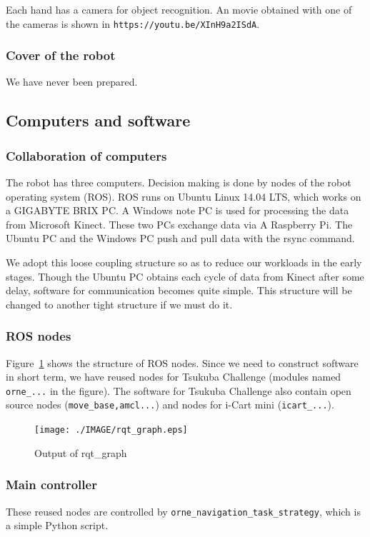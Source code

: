 \documentclass{llncs}
\begin{document}
Each hand has a camera for object recognition.
An movie obtained with one of the cameras is shown in
\texttt{https://youtu.be/XInH9a2ISdA}.


\subsubsection{Cover of the robot} We have never been prepared.

\subsection{Computers and software}

\subsubsection{Collaboration of computers}
The robot has three computers. Decision making is done by
nodes of the robot operating system (ROS).
ROS runs on Ubuntu Linux 14.04 LTS, which works on
a GIGABYTE BRIX PC. A Windows note PC is used for processing
the data from Microsoft Kinect.
These two PCs exchange data via A Raspberry Pi.
The Ubuntu PC and the Windows PC push and pull
data with the rsync command.

We adopt this loose coupling structure
so as to reduce our workloads in the early stages.
Though the Ubuntu PC obtains each cycle of data from Kinect
after some delay, software for communication becomes
quite simple. This structure will be changed to
another tight structure if we must do it.


\subsubsection{ROS nodes}
Figure~\ref{fig:rqt_graph} shows the structure of ROS nodes.
Since we need to construct software in short term, 
we have reused nodes for Tsukuba Challenge (modules named
\texttt{orne\_...} in the figure).
The software for Tsukuba Challenge also contain open source nodes
(\texttt{move\_base,amcl...}) and nodes for i-Cart mini (\texttt{icart\_...}).

\begin{figure}[p]
	\begin{center}
		\texttt{[image: ./IMAGE/rqt\_graph.eps]}
		\caption{Output of rqt\_graph}
		\label{fig:rqt_graph}
	\end{center}
\end{figure}

\subsubsection{Main controller}
These reused nodes are controlled by
\texttt{orne\_navigation\_task\_strategy},
which is a simple Python script.
\end{document}
